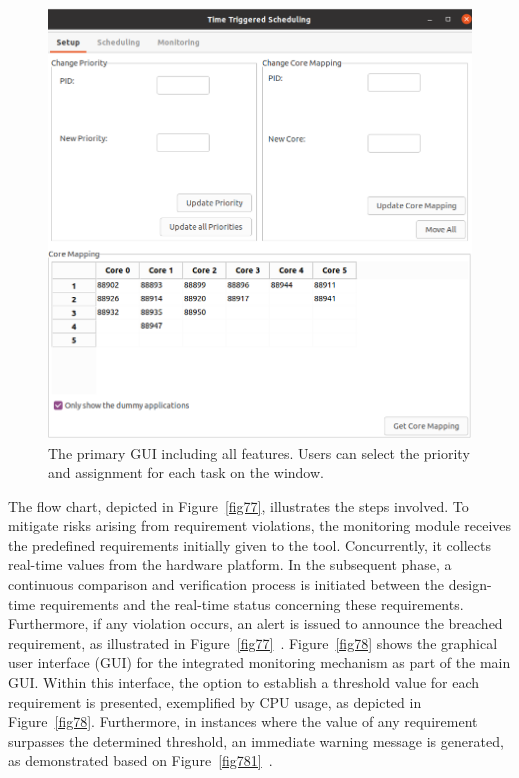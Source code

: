 \begin{itemize}
    \begin{figure}[b!]
    \centering
    \includegraphics[width=0.8\columnwidth]{figures/gui_scheduling.png}
    \caption{The primary GUI including all features.
    Users can select the priority and assignment for each task on the window.}
    \label{fig79}
    \end{figure}
    The flow chart, depicted in Figure~\ref{fig77}, illustrates the steps involved. To mitigate risks arising from requirement violations, the monitoring module receives the predefined requirements initially given to the tool. Concurrently, it collects real-time values from the hardware platform. In the subsequent phase, a continuous comparison and verification process is initiated between the design-time requirements and the real-time status concerning these requirements. Furthermore, if any violation occurs, an alert is issued to announce the breached requirement, as illustrated in Figure~\ref{fig77}~\cite{9613692}. Figure~\ref{fig78} shows the graphical user interface (GUI) for the integrated monitoring mechanism as part of the main GUI.
    Within this interface, the option to establish a threshold value for each requirement is presented, exemplified by CPU usage, as depicted in Figure~\ref{fig78}. 
    Furthermore, in instances where the value of any requirement surpasses the determined threshold, an immediate warning message is generated, as demonstrated based on Figure~\ref{fig781}~\cite{askaripoor2021flexible,9613692, askaripoor2023designer}.


\end{itemize}
